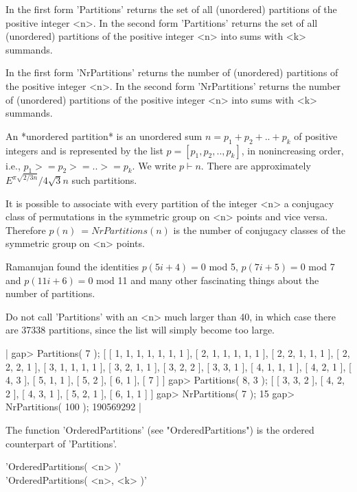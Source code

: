 In  the  first  form 'Partitions'   returns  the set  of all  (unordered)
partitions of the positive integer  <n>.  In the second form 'Partitions'
returns the set of all (unordered) partitions of the positive integer <n>
into sums with <k> summands.

In   the first form  'NrPartitions'  returns   the number of  (unordered)
partitions    of  the   positive integer   <n>.     In   the second  form
'NrPartitions' returns the     number of (unordered) partitions  of   the
positive integer <n> into sums with <k> summands.

An *unordered partition* is an  unordered sum $n =  p_1+p_2 +..+ p_k$  of
positive integers and is represented by the list  $p = [p_1,p_2,..,p_k]$,
in nonincreasing order, i.e., $p_1>=p_2>=..>=p_k$.  We write $p\vdash n$.
There   are approximately $E^{\pi \sqrt{2/3 n}}    / {4 \sqrt{3} n}$ such
partitions.

It  is possible to  associate with every partition  of the integer  <n> a
conjugacy class of permutations in the symmetric group on <n>  points and
vice  versa.   Therefore $p(n) \:=   NrPartitions(n)$  is  the  number of
conjugacy classes of the symmetric group on <n> points.

Ramanujan found the identities $p(5i+4) = 0$ mod 5, $p(7i+5) = 0$  mod  7
and  $p(11i+6) = 0$ mod 11 and many  other  fascinating  things about the
number of partitions.

Do not call 'Partitions' with an <n> much larger than 40, in  which  case
there are 37338 partitions, since the list will simply become too large.

|    gap> Partitions( 7 );
    [ [ 1, 1, 1, 1, 1, 1, 1 ], [ 2, 1, 1, 1, 1, 1 ], [ 2, 2, 1, 1, 1 ],
      [ 2, 2, 2, 1 ], [ 3, 1, 1, 1, 1 ], [ 3, 2, 1, 1 ], [ 3, 2, 2 ],
      [ 3, 3, 1 ], [ 4, 1, 1, 1 ], [ 4, 2, 1 ], [ 4, 3 ], [ 5, 1, 1 ],
      [ 5, 2 ], [ 6, 1 ], [ 7 ] ]
    gap> Partitions( 8, 3 );
    [ [ 3, 3, 2 ], [ 4, 2, 2 ], [ 4, 3, 1 ], [ 5, 2, 1 ], [ 6, 1, 1 ] ]
    gap> NrPartitions( 7 );
    15
    gap> NrPartitions( 100 );
    190569292 |

The function 'OrderedPartitions' (see "OrderedPartitions") is the ordered
counterpart of 'Partitions'.

%
%
%
%

'OrderedPartitions( <n> )' \\
'OrderedPartitions( <n>, <k> )'

